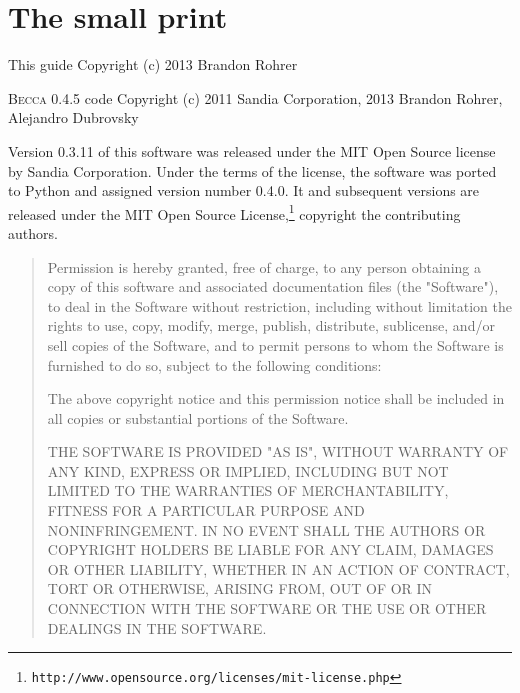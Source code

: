 \chapter{The small print}

This guide
Copyright (c) 2013 Brandon Rohrer

\textsc{Becca} 0.4.5 code
Copyright (c) 2011 Sandia Corporation,
2013 Brandon Rohrer, Alejandro Dubrovsky

Version 0.3.11 of this software was released under the MIT Open Source 
license by Sandia Corporation. Under the terms of the license, the 
software was ported to Python and assigned version number 0.4.0. It and
subsequent versions are released under the MIT Open Source License,\footnote{\texttt{http://www.opensource.org/licenses/mit-license.php}} copyright the contributing authors.

\begin{quote}
Permission is hereby granted, free of charge, to any person obtaining a copy
of this software and associated documentation files (the "Software"), to deal
in the Software without restriction, including without limitation the rights
to use, copy, modify, merge, publish, distribute, sublicense, and/or sell
copies of the Software, and to permit persons to whom the Software is
furnished to do so, subject to the following conditions:

The above copyright notice and this permission notice shall be included in
all copies or substantial portions of the Software.

THE SOFTWARE IS PROVIDED "AS IS", WITHOUT WARRANTY OF ANY KIND, EXPRESS OR
IMPLIED, INCLUDING BUT NOT LIMITED TO THE WARRANTIES OF MERCHANTABILITY,
FITNESS FOR A PARTICULAR PURPOSE AND NONINFRINGEMENT. IN NO EVENT SHALL THE
AUTHORS OR COPYRIGHT HOLDERS BE LIABLE FOR ANY CLAIM, DAMAGES OR OTHER
LIABILITY, WHETHER IN AN ACTION OF CONTRACT, TORT OR OTHERWISE, ARISING FROM,
OUT OF OR IN CONNECTION WITH THE SOFTWARE OR THE USE OR OTHER DEALINGS IN
THE SOFTWARE.

\end{quote}